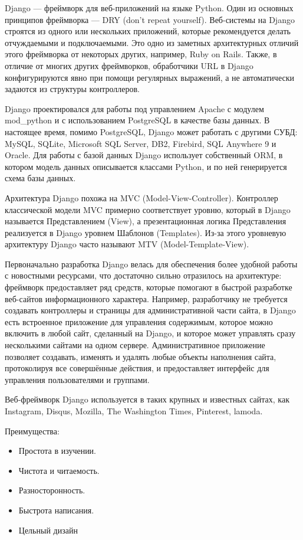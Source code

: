 Django — фреймворк для веб-приложений на языке Python.
Один из основных принципов фреймворка — DRY (don't repeat yourself).
Веб-системы на Django строятся из одного или нескольких приложений, которые рекомендуется делать отчуждаемыми и подключаемыми.
Это одно из заметных архитектурных отличий этого фреймворка от некоторых других, например, Ruby on Rails.
Также, в отличие от многих других фреймворков, обработчики URL в Django конфигурируются явно при помощи регулярных выражений, а не автоматически задаются из структуры контроллеров.

Django проектировался для работы под управлением Apache с модулем mod\_python и с использованием PostgreSQL в качестве базы данных.
В настоящее время, помимо PostgreSQL, Django может работать с другими СУБД: MySQL, SQLite, Microsoft SQL Server, DB2, Firebird, SQL Anywhere 9 и Oracle.
Для работы с базой данных Django использует собственный ORM, в котором модель данных описывается классами Python, и по ней генерируется схема базы данных.

Архитектура Django похожа на MVC (Model-View-Controller).
Контроллер классической модели MVC примерно соответствует уровню, который в Django называется Представлением (View), а презентационная логика Представления реализуется в Django уровнем Шаблонов (Templates).
Из-за этого уровневую архитектуру Django часто называют MTV (Model-Template-View).

Первоначально разработка Django велась для обеспечения более удобной работы с новостными ресурсами, что достаточно сильно отразилось на архитектуре: фреймворк предоставляет ряд средств, которые помогают в быстрой разработке веб-сайтов информационного характера.
Например, разработчику не требуется создавать контроллеры и страницы для административной части сайта, в Django есть встроенное приложение для управления содержимым, которое можно включить в любой сайт, сделанный на Django, и которое может управлять сразу несколькими сайтами на одном сервере.
Административное приложение позволяет создавать, изменять и удалять любые объекты наполнения сайта, протоколируя все совершённые действия, и предоставляет интерфейс для управления пользователями и группами.

Веб-фреймворк Django используется в таких крупных и известных сайтах, как Instagram, Disqus, Mozilla, The Washington Times, Pinterest, lamoda.

Преимущества:
\begin{itemize}
	\item Простота в изучении.
	\item Чистота и читаемость.
	\item Разносторонность.
	\item Быстрота написания.
	\item Цельный дизайн
\end{itemize}
